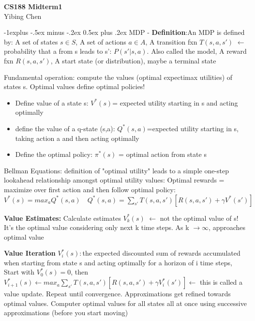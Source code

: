 \documentclass[10pt]{article}
\makeatletter
\renewcommand{\subsection}{\@startsection{subsection}{2}{0mm}%
                                {-1explus -.5ex minus -.2ex}%
                                {0.5ex plus .2ex}%
                                {\normalfont\normalsize\bfseries}}
\makeatother
\begin{document}
\linespread{1.6}

\raggedright
\footnotesize
\begin{multicols*}{2}

\setlength{\premulticols}{1pt}
\setlength{\postmulticols}{1pt}
\setlength{\multicolsep}{1pt}
\setlength{\columnsep}{2pt}

\begin{center}
     {\Large\textbf{CS188 Midterm1}} \\[1em]
     {\normalsize Yibing Chen}
\end{center}

\subsection{MDP}
- \textbf{Definition}:An MDP is defined by: A set of states $s \in S$, A set of actions $a \in A$, A transition fxn $T(s,a,s')$ $\leftarrow$ probability that a from s leads to s': $P(s' | s, a)$. Also called the model,  A reward fxn $R(s,a,s')$, A start state (or distribution), maybe a terminal state

	Fundamental operation: compute the values (optimal expectimax utilities) of states s. Optimal values define optimal policies!\\
\begin{itemize}
\item Define value of a state s: $V^*(s)$= expected utility starting in s and acting optimally
\item define the value of a q-state (s,a): $Q^*(s,a)$=expected utility starting in s, taking action a and then acting optimally
\item Define the optimal policy: $\pi^*(s)$ = optimal action from state s
\end{itemize}

	Bellman Equations: definition of "optimal utility" leads to a simple one-step lookahead relationship amongst optimal utility values: Optimal rewards = maximize over first action and then follow optimal policy:
$V^*(s) = max_a Q^*(s,a) \quad Q^*(s,a) = \displaystyle\sum_{s'}T(s,a,s')[R(s,a,s')+\gamma V^*(s')]$

	\textbf{Value Estimates: }Calculate estimates $V_k^*(s)$ $\leftarrow$ not the optimal value of s! It's the optimal value considering only next k time steps. As k $\rightarrow\infty$, approaches optimal value

\textbf{Value Iteration}	
 $V_i^*(s):$the expected discounted sum of rewards accumulated when starting from state s and acting optimally for a horizon of i time steps,  Start with $V_0^*(s)=0$, then $V^*_{i+1}(s)\leftarrow max_a \displaystyle\sum_{s'}T(s,a,s')[R(s,a,s')+\gamma V_i^*(s')] \leftarrow$ this is called a value update. Repeat until convergence. Approximations get refined towards optimal values. Computer optimal values for all states all at once using successive approximations (before you start moving)


\end{multicols*}
\end{document}
